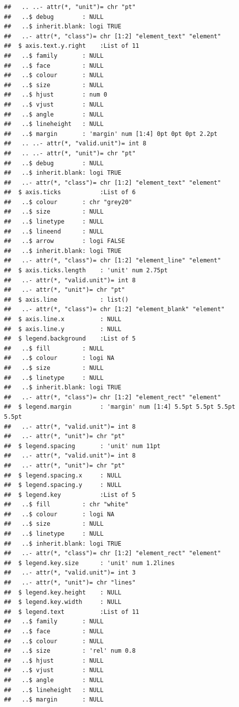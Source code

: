 \documentclass[]{article}
\begin{document}
\begin{verbatim}
##   .. ..- attr(*, "unit")= chr "pt"
##   ..$ debug        : NULL
##   ..$ inherit.blank: logi TRUE
##   ..- attr(*, "class")= chr [1:2] "element_text" "element"
##  $ axis.text.y.right    :List of 11
##   ..$ family       : NULL
##   ..$ face         : NULL
##   ..$ colour       : NULL
##   ..$ size         : NULL
##   ..$ hjust        : num 0
##   ..$ vjust        : NULL
##   ..$ angle        : NULL
##   ..$ lineheight   : NULL
##   ..$ margin       : 'margin' num [1:4] 0pt 0pt 0pt 2.2pt
##   .. ..- attr(*, "valid.unit")= int 8
##   .. ..- attr(*, "unit")= chr "pt"
##   ..$ debug        : NULL
##   ..$ inherit.blank: logi TRUE
##   ..- attr(*, "class")= chr [1:2] "element_text" "element"
##  $ axis.ticks           :List of 6
##   ..$ colour       : chr "grey20"
##   ..$ size         : NULL
##   ..$ linetype     : NULL
##   ..$ lineend      : NULL
##   ..$ arrow        : logi FALSE
##   ..$ inherit.blank: logi TRUE
##   ..- attr(*, "class")= chr [1:2] "element_line" "element"
##  $ axis.ticks.length    : 'unit' num 2.75pt
##   ..- attr(*, "valid.unit")= int 8
##   ..- attr(*, "unit")= chr "pt"
##  $ axis.line            : list()
##   ..- attr(*, "class")= chr [1:2] "element_blank" "element"
##  $ axis.line.x          : NULL
##  $ axis.line.y          : NULL
##  $ legend.background    :List of 5
##   ..$ fill         : NULL
##   ..$ colour       : logi NA
##   ..$ size         : NULL
##   ..$ linetype     : NULL
##   ..$ inherit.blank: logi TRUE
##   ..- attr(*, "class")= chr [1:2] "element_rect" "element"
##  $ legend.margin        : 'margin' num [1:4] 5.5pt 5.5pt 5.5pt 5.5pt
##   ..- attr(*, "valid.unit")= int 8
##   ..- attr(*, "unit")= chr "pt"
##  $ legend.spacing       : 'unit' num 11pt
##   ..- attr(*, "valid.unit")= int 8
##   ..- attr(*, "unit")= chr "pt"
##  $ legend.spacing.x     : NULL
##  $ legend.spacing.y     : NULL
##  $ legend.key           :List of 5
##   ..$ fill         : chr "white"
##   ..$ colour       : logi NA
##   ..$ size         : NULL
##   ..$ linetype     : NULL
##   ..$ inherit.blank: logi TRUE
##   ..- attr(*, "class")= chr [1:2] "element_rect" "element"
##  $ legend.key.size      : 'unit' num 1.2lines
##   ..- attr(*, "valid.unit")= int 3
##   ..- attr(*, "unit")= chr "lines"
##  $ legend.key.height    : NULL
##  $ legend.key.width     : NULL
##  $ legend.text          :List of 11
##   ..$ family       : NULL
##   ..$ face         : NULL
##   ..$ colour       : NULL
##   ..$ size         : 'rel' num 0.8
##   ..$ hjust        : NULL
##   ..$ vjust        : NULL
##   ..$ angle        : NULL
##   ..$ lineheight   : NULL
##   ..$ margin       : NULL

\end{verbatim}
\end{document}
